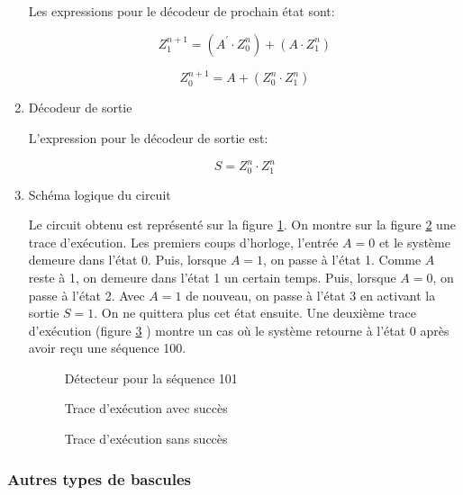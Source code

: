 \documentclass[11pt]{article}
\begin{document}
\begin{enumerate}
Les expressions pour le décodeur de prochain état sont:

$$ Z_1^{n+1} = (A^\prime \cdot Z_0^{n}) + (A \cdot  Z_1^{n}) $$

$$ Z_0^{n+1} = A + (Z_0^{n} \cdot Z_1^{n}) $$

\item Décodeur de sortie
\label{sec:org9c8224a}

L'expression pour le décodeur de sortie est:

$$ S = Z_0^{n} \cdot Z_1^{n} $$

\item Schéma logique du circuit
\label{sec:org6463b70}

Le circuit obtenu est représenté sur la figure
\ref{fig:org59b5617}. On montre sur la figure
\ref{fig:org4998072} une trace d'exécution. Les premiers coups
d'horloge, l'entrée \(A=0\) et le système demeure dans l'état 0. Puis,
lorsque \(A=1\), on passe à l'état 1. Comme \(A\) reste à 1, on
demeure dans l'état 1 un certain temps. Puis, lorsque \(A=0\), on
passe à l'état 2. Avec \(A=1\) de nouveau, on passe à l'état 3 en
activant la sortie \(S=1\). On ne quittera plus cet état ensuite. Une
deuxième trace d'exécution (figure \ref{fig:org60172d2} ) montre
un cas où le système retourne à l'état 0 après avoir reçu une
séquence 100.

\begin{figure}[htbp]
\centering

\caption{\label{fig:org59b5617}Détecteur pour la séquence 101}
\end{figure}

\begin{figure}[htbp]
\centering

\caption{\label{fig:org4998072}Trace d'exécution avec succès}
\end{figure}

\begin{figure}[htbp]
\centering

\caption{\label{fig:org60172d2}Trace d'exécution sans succès}
\end{figure}
\end{enumerate}

\subsubsection{Autres types de bascules}
\label{sec:org93628b3}
\end{document}
